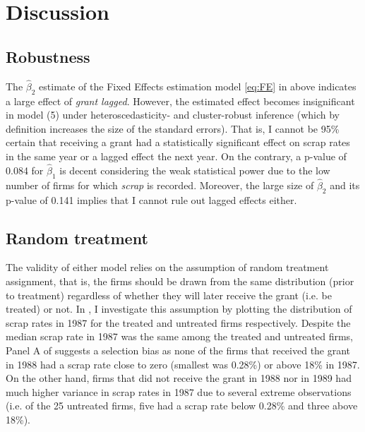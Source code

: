 \section{Discussion}
\label{s:discussion}

\subsection{Robustness}
\label{s:discussion_robustness}
The $\hat{\beta}_2$ estimate of the Fixed Effects estimation model \eqref{eq:FE} in  above \citep[identical to table 14.1 in][p. 464]{wooldridge2015introductory} indicates a large effect of \emph{grant lagged}. However, the estimated effect becomes insignificant in model (5) under heteroscedasticity- and cluster-robust inference (which by definition increases the size of the standard errors). That is, I cannot be 95\% certain that receiving a grant had a statistically significant effect on scrap rates in the same year or a lagged effect the next year. On the contrary, a p-value of 0.084 for $\hat{\beta}_1$ is decent considering the weak statistical power due to the low number of firms for which \emph{scrap} is recorded. Moreover, the large size of $\hat{\beta}_2$ and its p-value of 0.141 implies that I cannot rule out lagged effects either.

\subsection{Random treatment}
\label{s:discussion_random}
The validity of either model relies on the assumption of random treatment assignment, that is, the firms should be drawn from the same distribution (prior to treatment) regardless of whether they will later receive the grant (i.e. be treated) or not. In , I investigate this assumption by plotting the distribution of scrap rates in 1987 for the treated and untreated firms respectively. Despite the median scrap rate in 1987 was the same among the treated and untreated firms, Panel A of  suggests a selection bias as none of the firms that received the grant in 1988 had a scrap rate close to zero (smallest was 0.28\%) or above 18\% in 1987. On the other hand, firms that did not receive the grant in 1988 nor in 1989 had much higher variance in scrap rates in 1987 due to several extreme observations (i.e. of the 25 untreated firms, five had a scrap rate below 0.28\% and three above 18\%).
